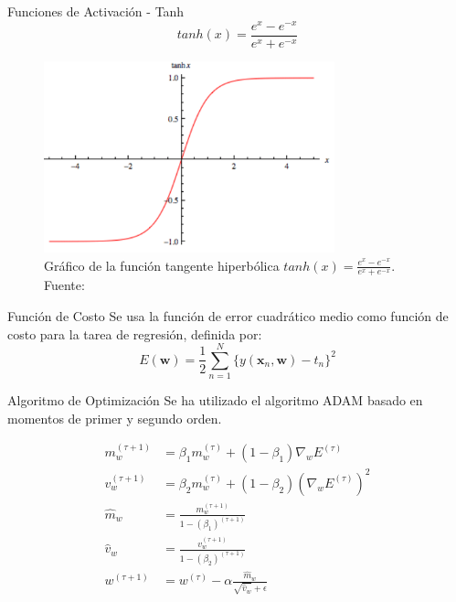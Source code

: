 \documentclass[10pt]{beamer}
\begin{document}
\begin{frame}{Funciones de Activación - Tanh}
    \begin{equation}\label{eq:tanh}
        tanh(x) = \frac{e^x - e^{-x}}{e^x + e^{-x}}
    \end{equation}

    \begin{figure}[!h] 
        \centering
        \includegraphics[width=0.75\textwidth]{../img/tanh}
        \caption[Gráfico de la función tangente hiperbólica]{Gráfico de la función tangente hiperbólica $tanh(x) = \frac{e^x - e^{-x}}{e^x + e^{-x}}$. Fuente: \cite{wang_2016} }
                \end{figure}
\end{frame}

\begin{frame}{Función de Costo}
    Se usa la función de \alert{error cuadrático medio} como función de costo 
    para la tarea de regresión, definida por:
    \begin{equation}\label{eq:error}
        E(\mathbf{w}) = \frac{1}{2} \sum_{n=1}^N \{y(\mathbf{x}_n, \mathbf{w}) - t_n\}^2
    \end{equation}
\end{frame}


\begin{frame}{Algoritmo de Optimización}
    Se ha utilizado el algoritmo \alert{ADAM} \cite{kingma2014adam} basado en momentos de primer y segundo orden.

    \begin{align}
        m_w^{(\tau + 1)} &= \beta_1 m_w^{(\tau)} + (1 - \beta_1) \nabla_w E^{(\tau)} \nonumber \\
        v_w^{(\tau + 1)} &= \beta_2 m_w^{(\tau)} + (1 - \beta_2) (\nabla_w E^{(\tau)})^2 \nonumber \\
        \hat{m}_w &= \frac{m_w^{(\tau + 1)}}{1 - (\beta_1)^{(\tau + 1)} } \nonumber \\
        \hat{v}_w &= \frac{v_w^{(\tau + 1)}}{1 - (\beta_2)^{(\tau + 1)} } \nonumber \\
        w^{(\tau + 1)} &= w^{(\tau)} - \alpha \frac{\hat{m}_w}{\sqrt{\hat{v}_w} + \epsilon} \label{eq:adam}
    \end{align}

\end{frame}
\end{document}
